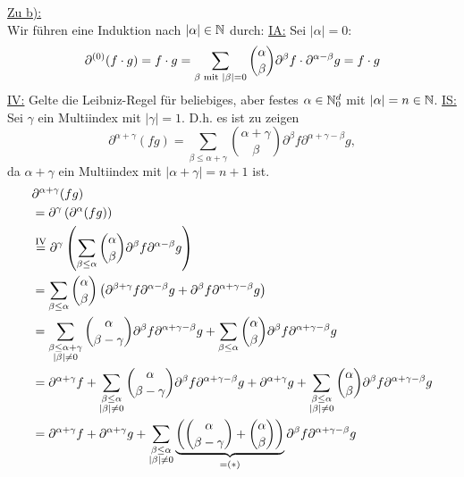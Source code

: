 \documentclass[12pt,a4paper]{article}
\begin{document}
\begin{lösung}
	\underline{Zu b):}\\
	Wir führen eine Induktion nach $|\alpha|\in\N$ durch:\nl
	\ul{IA:} Sei $|\alpha|=0$: 
	\begin{align*}
		\partial^{(0)}(f\cdot g)=f\cdot g=\sum\limits_{\beta\mit|\beta|=0}\binom{\alpha}{\beta}\partial^\beta f\cdot\partial^{\alpha-\beta} g=f\cdot g
	\end{align*}		
	\ul{IV:} Gelte die Leibniz-Regel für beliebiges, aber festes $\alpha\in\N_0^d$ mit $|\alpha|=n\in\N$.\nl
	\ul{IS:} Sei $\gamma$ ein Multiindex mit $|\gamma|=1$. D.h. es ist zu zeigen
	\begin{equation*}
		\partial^{\alpha + \gamma}(fg) = \displaystyle \sum_{\beta \leq \alpha + \gamma} \binom{\alpha + \gamma}{\beta}\partial^\beta f \partial^{\alpha+\gamma -\beta}g,
	\end{equation*}
	da $\alpha + \gamma$ ein Multiindex mit $|\alpha + \gamma|=n+1$ ist.
	\begin{align*}
		&\partial^{\alpha + \gamma}(fg)\\
		&= \partial^{\gamma}\left( \partial^\alpha(fg) \right)\\
		&\stackeq{\text{IV}} \partial^{\gamma}\left( \displaystyle \sum_{\beta \leq \alpha} \binom{\alpha }{\beta}\partial^\beta f \partial^{\alpha -\beta}g \right)\\
		&= \displaystyle \sum_{\beta \leq \alpha} \binom{\alpha }{\beta} \left( \partial^{\beta+\gamma} f \partial^{\alpha -\beta}g + \partial^{\beta} f \partial^{\alpha +\gamma -\beta}g \right)\\
		&= \displaystyle \sum_{\substack{\beta \leq \alpha + \gamma \\ |\beta|\neq 0}} \binom{\alpha }{\beta - \gamma} \partial^{\beta} f \partial^{\alpha +\gamma -\beta}g + \displaystyle \sum_{\beta \leq \alpha} \binom{\alpha }{\beta}  \partial^{\beta} f \partial^{\alpha +\gamma -\beta}g\\
		&= \partial^{\alpha +\gamma}f + \displaystyle \sum_{\substack{\beta \leq \alpha \\ |\beta|\neq 0}} \binom{\alpha }{\beta - \gamma} \partial^{\beta} f \partial^{\alpha +\gamma -\beta}g + \partial^{\alpha +\gamma}g + \displaystyle \sum_{\substack{\beta \leq \alpha \\ |\beta|\neq 0 }} \binom{\alpha }{\beta}  \partial^{\beta} f \partial^{\alpha +\gamma -\beta}g\\
		&= \partial^{\alpha +\gamma}f + \partial^{\alpha +\gamma}g + \displaystyle \sum_{\substack{\beta \leq \alpha \\ |\beta|\neq 0}} \underbrace{\left( \binom{\alpha }{\beta - \gamma} + \binom{\alpha }{\beta} \right)}_{=(*)} \partial^{\beta} f \partial^{\alpha +\gamma -\beta}g\\

\end{align*}
\end{lösung}
\end{document}
